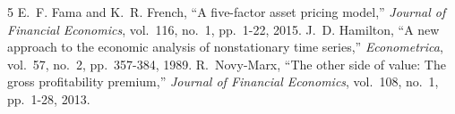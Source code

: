 \documentclass[11pt]{article}
\begin{document}
\begin{thebibliography}{5}
 E.~F. Fama and K.~R. French, ``A five-factor asset pricing model,'' \textit{Journal of Financial Economics}, vol.~116, no.~1, pp.~1-22, 2015.
 J.~D. Hamilton, ``A new approach to the economic analysis of nonstationary time series,'' \textit{Econometrica}, vol.~57, no.~2, pp.~357-384, 1989.
 R.~Novy-Marx, ``The other side of value: The gross profitability premium,'' \textit{Journal of Financial Economics}, vol.~108, no.~1, pp.~1-28, 2013.
\end{thebibliography}
\end{document}
